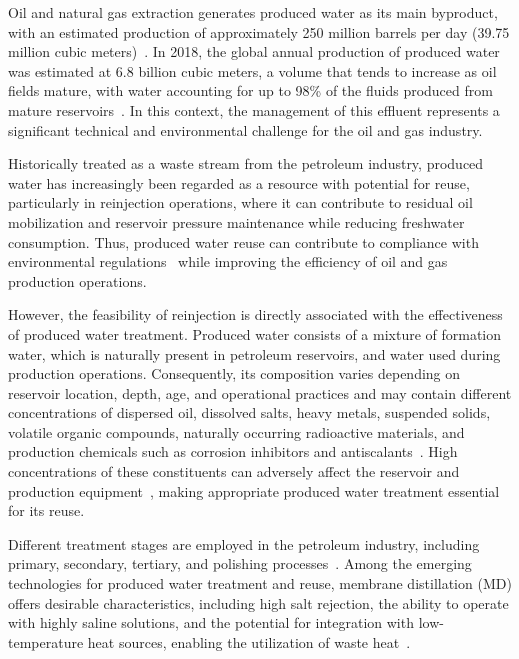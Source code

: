 
Oil and natural gas extraction generates produced water as its main byproduct, with an estimated production of approximately 250 million barrels per day (39.75 million cubic meters)~\cite{w15162980,MembranePW_JSDEWES_2024}. In 2018, the global annual production of produced water was estimated at 6.8 billion cubic meters, a volume that tends to increase as oil fields mature, with water accounting for up to 98\% of the fluids produced from mature reservoirs~\cite{w15234088,ALGHOUTI2019222}. In this context, the management of this effluent represents a significant technical and environmental challenge for the oil and gas industry.

Historically treated as a waste stream from the petroleum industry, produced water has increasingly been regarded as a resource with potential for reuse, particularly in reinjection operations, where it can contribute to residual oil mobilization and reservoir pressure maintenance while reducing freshwater consumption. Thus, produced water reuse can contribute to compliance with environmental regulations~\cite{OSPAR2001,EPA435,CONAMA3932007} while improving the efficiency of oil and gas production operations.

However, the feasibility of reinjection is directly associated with the effectiveness of produced water treatment. Produced water consists of a mixture of formation water, which is naturally present in petroleum reservoirs, and water used during production operations. Consequently, its composition varies depending on reservoir location, depth, age, and operational practices and may contain different concentrations of dispersed oil, dissolved salts, heavy metals, suspended solids, volatile organic compounds, naturally occurring radioactive materials, and production chemicals such as corrosion inhibitors and antiscalants~\cite{BEYER2020105155,ALGHOUTI2019222,w13020183}. High concentrations of these constituents can adversely affect the reservoir and production equipment~\cite{BADER2007159,AKSTINAT2019124011}, making appropriate produced water treatment essential for its reuse.

Different treatment stages are employed in the petroleum industry, including primary, secondary, tertiary, and polishing processes~\cite{Amakiri2022ProducedWaterReview,Adepitan2026HybridPW,Rajbongshi2024ProducedWaterReview,Ahmadun2009PWTechnologies}. Among the emerging technologies for produced water treatment and reuse, membrane distillation (MD) offers desirable characteristics, including high salt rejection, the ability to operate with highly saline solutions, and the potential for integration with low-temperature heat sources, enabling the utilization of waste heat~\cite{Yan2021MDWastewater,Kaur2023MDOverview,Adewole2022MDDesalination}.

